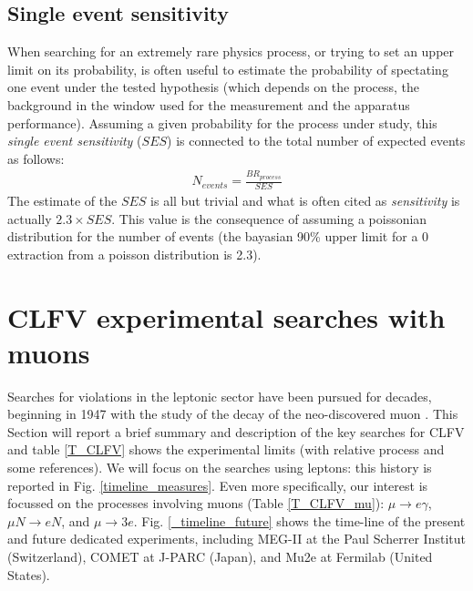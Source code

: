 \documentclass[12pt,a4paper,openright, oneside, titlepage]{book} %
\begin{document}
\subsection{Single event sensitivity}
When searching for an extremely rare physics process, 
or trying to set an upper limit on its probability, 
is often useful to estimate the probability of spectating one event 
under the tested hypothesis 
(which depends on the process, the background in the window used for the measurement 
and the apparatus performance). 
Assuming a given probability for the process under study, 
this \textit{single event sensitivity} ($SES$) is connected to the total number of expected events as follows:
\begin{align*}
N_{events} = \frac{BR_{process}}{SES}
\end{align*}
The estimate of the $SES$ is all but trivial 
and what is often cited as \textit{sensitivity} is actually $2.3\times SES$. 
This value is the consequence of assuming a poissonian distribution 
for the number of events (the bayasian 90\% upper limit for a 0 extraction from a poisson distribution is 2.3).\\

\section{CLFV experimental searches with muons}
Searches for violations in the leptonic sector have been pursued for decades, 
beginning in 1947 \cite{ConvPancPicc} with the study of the decay of the neo-discovered muon \cite{Anderson}.
This Section will report a brief summary and description 
of the key searches for CLFV and table \ref{T_CLFV} shows the experimental limits 
(with relative process and some references). 
We will focus on the searches using leptons: 
this history is reported in  Fig. \ref{timeline_measures}. 
Even more specifically, our interest is focussed on the processes involving muons 
(Table \ref{T_CLFV_mu}): $\mu\rightarrow e\gamma$, $\mu N\rightarrow e N$, and $\mu\rightarrow 3e$.
Fig. \ref{_timeline_future} shows the time-line of the present and future dedicated experiments,
including MEG-II at the Paul Scherrer Institut (Switzerland), COMET at J-PARC (Japan),
and Mu2e at Fermilab (United States).
\end{document}

